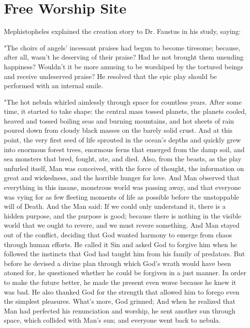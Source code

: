 \documentclass[a4paper,12pt]{book}[2004/02/16]
\theoremstyle{ilemma}
\theoremstyle{itheorem}
\theoremstyle{iother}
\theoremstyle{icorollary}
\theoremstyle{numcorollary}
\theoremstyle{idefinition}
\begin{document}
\chapter{Free Worship Site}
Mephistopheles explained the creation story to Dr. Faustus in his study, saying:

"The choirs of angels' incessant praises had begun to become tiresome; because, after all, wasn't he deserving of their praise? Had he not brought them unending happiness? Wouldn't it be more amusing to be worshiped by the tortured beings and receive undeserved praise? He resolved that the epic play should be performed with an internal smile.

"The hot nebula whirled aimlessly through space for countless years. After some time, it started to take shape: the central mass tossed planets, the planets cooled, heaved and tossed boiling seas and burning mountains, and hot sheets of rain poured down from cloudy black masses on the barely solid crust. And at this point, the very first seed of life sprouted in the ocean's depths and quickly grew into enormous forest trees, enormous ferns that emerged from the damp soil, and sea monsters that bred, fought, ate, and died. Also, from the
beasts, as the play unfurled itself, Man was conceived, with the force of
thought, the information on great and wickedness, and the horrible hunger for
love. And Man observed that everything in this insane, monstrous world was passing away, and that everyone was vying for as few fleeting moments of life as possible before the unstoppable will of Death. And the Man said: If we could only understand it, there is a hidden purpose, and the purpose is good; because there is nothing in the visible world that we ought to revere, and we must revere something. And Man stayed out of the conflict, deciding that God wanted harmony to emerge from chaos through human efforts. He called it Sin and asked God to forgive him when he followed the instincts that God had taught him from his family of predators. But before he devised a divine plan through which God's wrath would have been atoned for, he questioned whether he could be forgiven in a just manner. In order to make the future better, he made the present even worse because he knew it was bad. He also thanked God for the strength that allowed him to forego even the simplest pleasures.
What's more, God grinned; And when he realized that Man had perfected his renunciation and worship, he sent another sun through space, which collided with Man's sun; and everyone went back to nebula.
\end{document}
